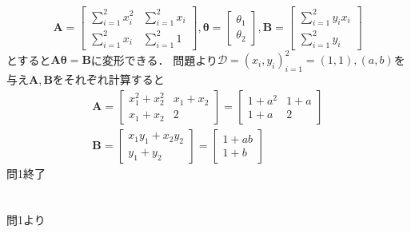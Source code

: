 \documentclass[uplatex,b5j]{jsarticle} %
\begin{document}
\begin{equation} \label{eq:6}
    \boldsymbol{A}=\left[
        \begin{array}{cc}
            \sum_{i=1}^{2}x_{i}^{2} & \sum_{i=1}^{2}x_i \\
            \sum_{i=1}^{2}x_i & \sum_{i=1}^{2}1
        \end{array}
    \right],
    \boldsymbol{\theta}=\left[
        \begin{array}{c}
            \theta_1 \\
            \theta_2
        \end{array}
    \right],
    \boldsymbol{B}=\left[
        \begin{array}{c}
            \sum_{i=1}^{2}y_ix_i  \\
            \sum_{i=1}^{2}y_i
        \end{array}
    \right]
\end{equation}
とすると$\boldsymbol{A\theta}=\boldsymbol{B}$に変形できる．
問題より$\mathcal{D}={(x_i, y_i)_{i=1}^2={(1,1),(a,b)}}$を与え$\boldsymbol{A}, \boldsymbol{B}$をそれぞれ計算すると
\begin{eqnarray}
    \boldsymbol{A}=\left[
        \begin{array}{cc} \label{eq:7}
            x_{1}^{2}+x_{2}^{2} & x_{1}+x_{2} \\
            x_{1}+x_{2} & 2
        \end{array}
    \right]
    = \left[
        \begin{array}{cc}
            1+a^{2} & 1+a \\
            1+a & 2
        \end{array}
    \right]
    \\
    \boldsymbol{B}=\left[
        \begin{array}{c} \label{eq:8}
            x_{1}y_{1}+x_{2}y_{2}  \\
            y_{1}+y_{2}
        \end{array}
    \right]
    = \left[
        \begin{array}{cc}
            1+ab \\
            1+b
        \end{array}
    \right]
\end{eqnarray}
問1終了
\section{}
問1より
\end{document}
